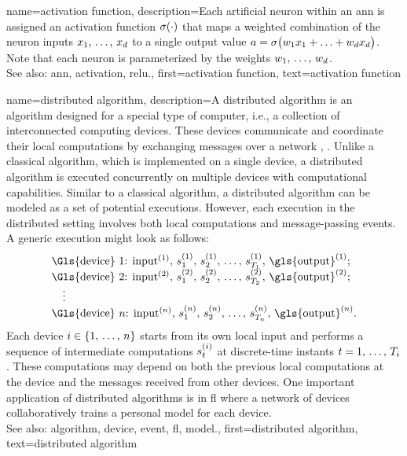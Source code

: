 {name={activation function},
	description={Each artificial neuron within an \gls{ann} is 
		assigned an \gls{activation} \gls{function} $\sigma(\cdot)$ that maps a weighted 
		combination of the neuron inputs $x_{1}, \,\ldots, \,x_{d}$ 
		to a single \gls{output} value $a = \sigma\big(w_{1} x_{1}+\ldots+w_{d} x_{d} \big)$. 
		Note that each neuron is parameterized by the \glspl{weight} $w_{1}, \,\ldots, \,w_{d}$.
					\\ 
		See also: \gls{ann}, \gls{activation}, \gls{relu}.},
	first={activation function},
	text={activation function} 
}

{name={distributed algorithm},
	description={A distributed \gls{algorithm} is an \gls{algorithm} designed for 
		a special type of computer, i.e., a collection of interconnected computing \glspl{device}.
		These \glspl{device} communicate and coordinate their local computations by exchanging
		messages over a network \cite{ParallelDistrBook}, \cite{IntroDistAlg}. Unlike a classical \gls{algorithm},
		which is implemented on a single \gls{device}, a distributed \gls{algorithm} is
		executed concurrently on multiple \glspl{device} with computational capabilities.
		Similar to a classical \gls{algorithm}, a distributed \gls{algorithm} can be modeled as a
		set of potential executions. However, each execution in the distributed setting involves
		both local computations and message-passing \glspl{event}. A generic execution might look as
		follows:
		\[
		\begin{array}{l}
			\text{\Gls{device} } 1\text{: } {\rm input}^{(1)}, \,s_1^{(1)}, \,s_2^{(1)}, \,\ldots, \,s_{T_1}^{(1)}, \,{\rm \gls{output}}^{(1)}; \\
			\text{\Gls{device} } 2\text{: } {\rm input}^{(2)}, \,s_1^{(2)}, \,s_2^{(2)}, \,\ldots, \,s_{T_2}^{(2)}, \,{\rm \gls{output}}^{(2)}; \\
			\quad \vdots \\
			\text{\Gls{device} } \nrnodes\text{: } {\rm input}^{(\nrnodes)}, \,s_1^{(\nrnodes)}, \,s_2^{(\nrnodes)}, \,\ldots, \,s_{T_{\nrnodes}}^{(\nrnodes)}, \,{\rm \gls{output}}^{(\nrnodes)}.
		\end{array}
		\]
		Each \gls{device} $i \in \{1,\,\ldots,\,n\}$ starts from its own local input and performs a \gls{sequence} of 
		intermediate computations $s_{t}^{(i)}$ at discrete-time instants $t = 1, \,\dots, \,T_{i}$. 
		These computations may depend on both the previous local computations at the \gls{device} 
		and the messages received from other \glspl{device}. One important application of distributed 
		\glspl{algorithm} is in \gls{fl} where a network of \glspl{device} collaboratively trains a personal \gls{model} 
		for each \gls{device}. 
					\\ 
		See also: \gls{algorithm}, \gls{device}, \gls{event}, \gls{fl}, \gls{model}.},
	first={distributed algorithm}, 
	text={distributed algorithm}
}

